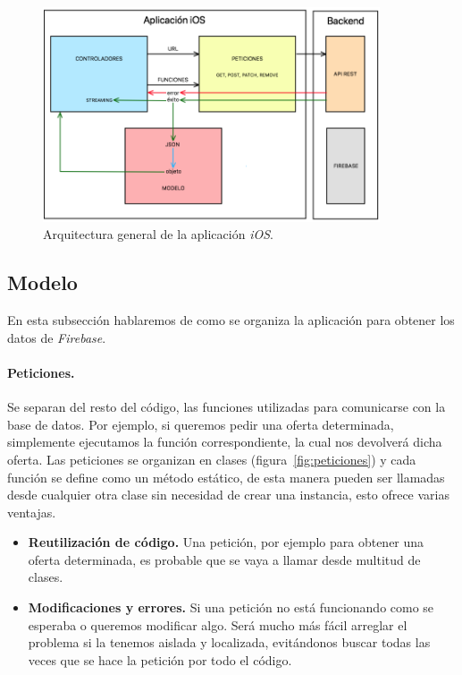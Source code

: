 \begin{figure}[tb]
\centering
\includegraphics[width=0.89\textwidth]{figures/esquema-impl.png}
\caption{Arquitectura general de la aplicación \emph{iOS}.\label{fig:arq_ios}}
\end{figure}

\subsection{Modelo}
En esta subsección hablaremos de como se organiza la aplicación para obtener los datos de \textit{Firebase}.

\paragraph{Peticiones.}
Se separan del resto del código, las funciones utilizadas para comunicarse con la base de datos. Por ejemplo, si queremos pedir una oferta determinada, simplemente ejecutamos la función correspondiente, la cual nos devolverá dicha oferta. Las peticiones se organizan en clases (figura~\ref{fig:peticiones}) y cada función se define como un método estático, de esta manera pueden ser llamadas desde cualquier otra clase sin necesidad de crear una instancia, esto ofrece varias ventajas.

\begin{itemize}
\item{}\textbf{Reutilización de código.} Una petición, por ejemplo para obtener una oferta determinada, es probable que se vaya a llamar desde multitud de clases.

\item{}\textbf{Modificaciones y errores.} Si una petición no está funcionando como se esperaba o queremos modificar algo. Será mucho más fácil arreglar el problema si la tenemos aislada y localizada, evitándonos buscar todas las veces que se hace la petición por todo el código.
\end{itemize}

